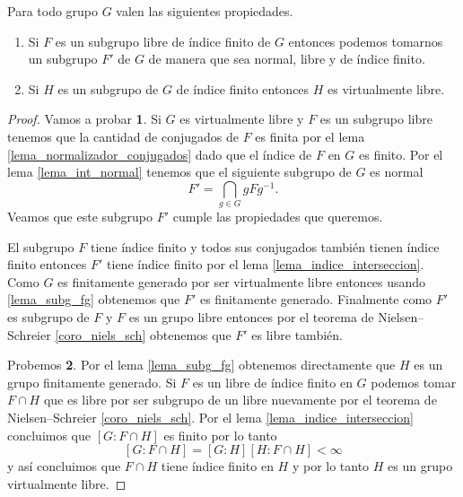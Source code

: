 \documentclass[tesis.tex]{subfiles}
\begin{document}
\begin{prop}\label{prop_vls}
	Para todo grupo $G$ \vl valen las siguientes propiedades.
	\begin{enumerate}
		\item Si $F$ es un subgrupo libre de índice finito de $G$ entonces podemos tomarnos un subgrupo $F'$ de $G$ de manera que sea normal, libre y de índice finito.
		\item Si $H$ es un subgrupo de $G$ de índice finito entonces $H$ es virtualmente libre.
	\end{enumerate}
\end{prop}

\begin{proof}
	Vamos a probar \textbf{1}.
	Si $G$ es virtualmente libre y $F$ es un subgrupo libre tenemos que la cantidad de conjugados de $F$ es finita por el lema \ref{lema_normalizador_conjugados} dado que el índice de $F$ en $G$ es finito.
	Por el lema \ref{lema_int_normal} tenemos que el siguiente subgrupo de $G$ es normal
	\[
	F' = \bigcap_{g \in G} gFg^{-1}.
	\]
	Veamos que este subgrupo $F'$ cumple las propiedades que queremos. 
	
	
	El subgrupo $F$ tiene índice finito y todos sus conjugados también tienen índice finito entonces $F'$ tiene índice finito por el lema \ref{lema_indice_interseccion}.
	Como $G$ es finitamente generado por ser virtualmente libre entonces usando \ref{lema_subg_fg} obtenemos que $F'$ es finitamente generado.
	Finalmente como $F'$ es subgrupo de $F$ y $F$ es un grupo libre entonces por el teorema de Nielsen--Schreier \ref{coro_niels_sch} obtenemos que $F'$ es libre también.
	
	
	Probemos \textbf{2}. 
	Por el lema \ref{lema_subg_fg} obtenemos directamente que $H$ es un grupo finitamente generado.
	Si $F$ es un libre de índice finito en $G$ podemos tomar $F \cap H$ que es libre por ser subgrupo de un libre nuevamente por el teorema de Nielsen--Schreier \ref{coro_niels_sch}.
	Por el lema \ref{lema_indice_interseccion} concluimos que $[G:F \cap H]$ es finito por lo tanto 
	\[
		[G:F \cap H] = [G : H][H : F \cap H] < \infty	
	\]
	y así concluimos que $F \cap H$ tiene índice finito en $H$ y por lo tanto $H$ es un grupo virtualmente libre.
	
\end{proof}
\end{document}
